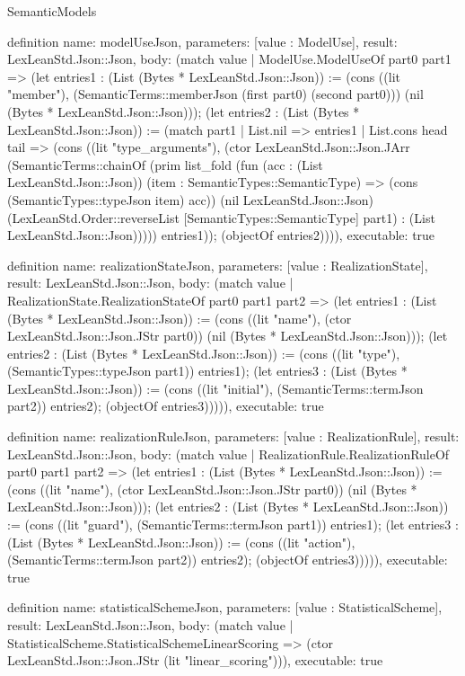 \begin{lexlean}{SemanticModels}
\begin{semanticmodule}
definition{
  name: modelUseJson,
  parameters: [value : ModelUse],
  result: LexLeanStd.Json::Json,
  body: (match value
    | ModelUse.ModelUseOf part0 part1 => (let entries1 : (List (Bytes * LexLeanStd.Json::Json)) := (cons ((lit "member"), (SemanticTerms::memberJson (first part0) (second part0))) (nil (Bytes * LexLeanStd.Json::Json))); (let entries2 : (List (Bytes * LexLeanStd.Json::Json)) := (match part1
      | List.nil => entries1
      | List.cons head tail => (cons ((lit "type_arguments"), (ctor LexLeanStd.Json::Json.JArr (SemanticTerms::chainOf (prim list_fold (fun (acc : (List LexLeanStd.Json::Json)) (item : SemanticTypes::SemanticType) => (cons (SemanticTypes::typeJson item) acc)) (nil LexLeanStd.Json::Json) (LexLeanStd.Order::reverseList [SemanticTypes::SemanticType] part1) : (List LexLeanStd.Json::Json))))) entries1)); (objectOf entries2)))),
  executable: true
}

definition{
  name: realizationStateJson,
  parameters: [value : RealizationState],
  result: LexLeanStd.Json::Json,
  body: (match value
    | RealizationState.RealizationStateOf part0 part1 part2 => (let entries1 : (List (Bytes * LexLeanStd.Json::Json)) := (cons ((lit "name"), (ctor LexLeanStd.Json::Json.JStr part0)) (nil (Bytes * LexLeanStd.Json::Json))); (let entries2 : (List (Bytes * LexLeanStd.Json::Json)) := (cons ((lit "type"), (SemanticTypes::typeJson part1)) entries1); (let entries3 : (List (Bytes * LexLeanStd.Json::Json)) := (cons ((lit "initial"), (SemanticTerms::termJson part2)) entries2); (objectOf entries3))))),
  executable: true
}

definition{
  name: realizationRuleJson,
  parameters: [value : RealizationRule],
  result: LexLeanStd.Json::Json,
  body: (match value
    | RealizationRule.RealizationRuleOf part0 part1 part2 => (let entries1 : (List (Bytes * LexLeanStd.Json::Json)) := (cons ((lit "name"), (ctor LexLeanStd.Json::Json.JStr part0)) (nil (Bytes * LexLeanStd.Json::Json))); (let entries2 : (List (Bytes * LexLeanStd.Json::Json)) := (cons ((lit "guard"), (SemanticTerms::termJson part1)) entries1); (let entries3 : (List (Bytes * LexLeanStd.Json::Json)) := (cons ((lit "action"), (SemanticTerms::termJson part2)) entries2); (objectOf entries3))))),
  executable: true
}

definition{
  name: statisticalSchemeJson,
  parameters: [value : StatisticalScheme],
  result: LexLeanStd.Json::Json,
  body: (match value
    | StatisticalScheme.StatisticalSchemeLinearScoring => (ctor LexLeanStd.Json::Json.JStr (lit "linear_scoring"))),
  executable: true
}


\end{semanticmodule}
\end{lexlean}
